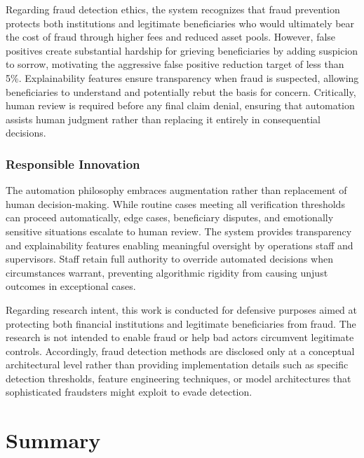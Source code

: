 Regarding fraud detection ethics, the system recognizes that fraud prevention protects both institutions and legitimate beneficiaries who would ultimately bear the cost of fraud through higher fees and reduced asset pools. However, false positives create substantial hardship for grieving beneficiaries by adding suspicion to sorrow, motivating the aggressive false positive reduction target of less than 5\%. Explainability features ensure transparency when fraud is suspected, allowing beneficiaries to understand and potentially rebut the basis for concern. Critically, human review is required before any final claim denial, ensuring that automation assists human judgment rather than replacing it entirely in consequential decisions.

\subsubsection{Responsible Innovation}

The automation philosophy embraces augmentation rather than replacement of human decision-making. While routine cases meeting all verification thresholds can proceed automatically, edge cases, beneficiary disputes, and emotionally sensitive situations escalate to human review. The system provides transparency and explainability features enabling meaningful oversight by operations staff and supervisors. Staff retain full authority to override automated decisions when circumstances warrant, preventing algorithmic rigidity from causing unjust outcomes in exceptional cases.

Regarding research intent, this work is conducted for defensive purposes aimed at protecting both financial institutions and legitimate beneficiaries from fraud. The research is not intended to enable fraud or help bad actors circumvent legitimate controls. Accordingly, fraud detection methods are disclosed only at a conceptual architectural level rather than providing implementation details such as specific detection thresholds, feature engineering techniques, or model architectures that sophisticated fraudsters might exploit to evade detection.

\section{Summary}

